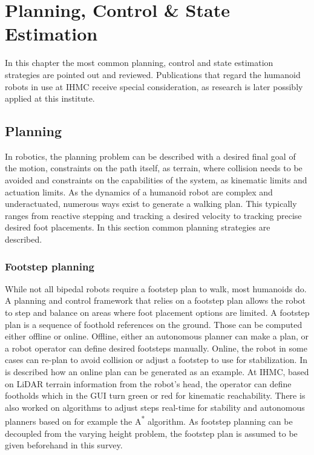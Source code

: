 %
\chapter{Planning, Control \& State Estimation}%
\label{chap:planningcontrol}
In this chapter the most common planning, control and state estimation strategies are pointed out and reviewed. Publications that regard the humanoid robots in use at IHMC receive special consideration, as research is later possibly applied at this institute.

\section{Planning}
In robotics, the planning problem can be described with a desired final goal of the motion, constraints on the path itself, as terrain, where collision needs to be avoided and constraints on the capabilities of the system, as kinematic limits and actuation limits. As the dynamics of a humanoid robot are complex and underactuated, numerous ways exist to generate a walking plan. This typically ranges from reactive stepping and tracking a desired velocity to tracking precise desired foot placements. In this section common planning strategies are described.

\subsection{Footstep planning}
While not all bipedal robots require a footstep plan to walk, most humanoids do. A planning and control framework that relies on a footstep plan allows the robot to step and balance on areas where foot placement options are limited.  A footstep plan is a sequence of foothold references on the ground. Those can be computed either offline or online. Offline, either an autonomous planner can make a plan, or a robot operator can define desired footsteps manually. Online, the robot in some cases can re-plan to avoid collision or adjust a footstep to use for stabilization. In \cite{chestnutt2005footstep} is described how an online plan can be generated as an example. At IHMC, based on LiDAR terrain information from the robot's head, the operator can define footholds which in the \ac{GUI} turn green or red for kinematic reachability. There is also worked on algorithms to adjust steps real-time for stability \cite{griffin2017walking} and autonomous planners based on for example the A\textsuperscript{*} algorithm. As footstep planning can be decoupled from the varying height problem, the footstep plan is assumed to be given beforehand in this survey.

